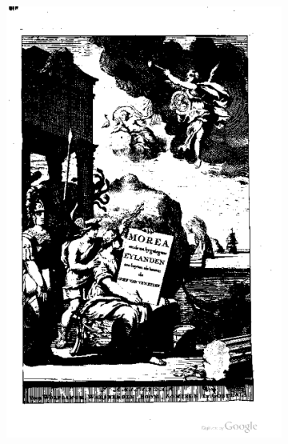 \begin{figure}
\centering
    \begin{subfigure}[b]{0.4\textwidth}
\includegraphics[width=\textwidth]{resources/500_0008}
    \end{subfigure}
    \begin{subfigure}[b]{0.4\textwidth}

\end{subfigure}
\end{figure}
